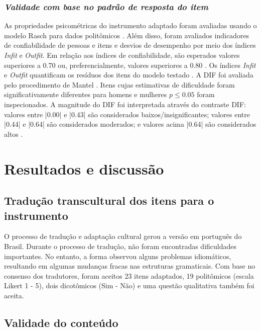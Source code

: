 \subsubsection*{\textit{Validade com base no padrão de resposta do item}}

As propriedades psicométricas do instrumento adaptado foram avaliadas usando o modelo Rasch para dados politômicos \cite{Andrich1978ACategories}. Além disso, foram avaliados indicadores de confiabilidade de pessoas e itens e desvios de desempenho por meio dos índices \textit{Infit} e \textit{Outfit}. Em relação aos índices de confiabilidade, são esperados valores superiores a 0.70 ou, preferencialmente, valores superiores a 0.80 \cite{Linacre2012WinstepsGuide}. Os índices \textit{Infit} e \textit{Outfit} quantificam os resíduos dos itens do modelo testado \cite{Linacre2012WinstepsGuide,Bond2013ApplyingSciences}. A DIF foi avaliada pelo procedimento de Mantel \cite{Wright1994ReasonableTransactions}. Itens cujas estimativas de dificuldade foram significativamente diferentes para homens e mulheres $p \leq 0.05$ foram inspecionados. 
A magnitude do DIF foi interpretada através do contraste DIF: valores entre |0.00| e |0.43| são considerados baixos/insignificantes; valores entre |0.44| e |0.64| são considerados moderados; e valores acima |0.64| são considerados altos \cite{Linacre2012WinstepsGuide}. 

\section{Resultados e discussão}

\subsection{Tradução transcultural dos itens para o instrumento}

O processo de tradução e adaptação cultural gerou a versão em português do Brasil. Durante o processo de tradução, não foram encontradas dificuldades importantes. No entanto, a forma observou alguns problemas idiomáticos, resultando em algumas mudanças fracas nas estruturas gramaticais. Com base no consenso dos tradutores, foram aceitos 23 itens adaptados, 19 politômicos (escala Likert 1 - 5), dois dicotômicos (Sim - Não) e uma questão qualitativa também foi aceita.


\subsection{Validade do conteúdo}

